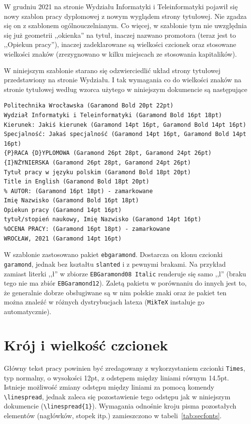 W grudniu 2021 na stronie Wydziału Informatyki i Teleinformatyki pojawił się nowy szablon pracy dyplomowej z nowym wyglądem strony tytułowej. Nie zgadza się on z szablonem ogólnouczelnianym. Co więcej, w szablonie tym nie uwzględnia się już geometrii ,,okienka'' na tytuł, inaczej nazwano promotora (teraz jest to ,,Opiekun pracy''), inaczej zadeklarowane są wielkości czcionek oraz stosowane wielkości znaków (zrezygnowano w kilku miejscach ze stosowania kapitalików).

W niniejszym szablonie starano się odzwierciedlić układ strony tytułowej przedstawiony na stronie Wydziału. I tak wymagania co do wielkości znaków na stronie tytułowej według wzorca użytego w niniejszym dokumencie są następujące
\begin{lstlisting}[basicstyle=\footnotesize\ttfamily]
Politechnika Wrocławska (Garamond Bold 20pt 22pt)
Wydział Informatyki i Teleinformatyki (Garamond Bold 16pt 18pt)
Kierunek: Jakiś kierunek (Garamond 14pt 16pt, Garamond Bold 14pt 16pt)
Specjalność: Jakaś specjalność (Garamond 14pt 16pt, Garamond Bold 14pt 16pt)
{P}RACA {D}YPLOMOWA (Garamond 26pt 28pt, Garamond 24pt 26pt)
{I}NŻYNIERSKA (Garamond 26pt 28pt, Garamond 24pt 26pt)
Tytuł pracy w języku polskim (Garamond Bold 18pt 20pt)
Title in English (Garamond Bold 18pt 20pt)
% AUTOR: (Garamond 16pt 18pt) - zamarkowane
Imię Nazwisko (Garamond Bold 16pt 18pt)
Opiekun pracy (Garamond 14pt 16pt)
tytuł/stopień naukowy, Imię Nazwisko (Garamond 14pt 16pt)
%OCENA PRACY: (Garamond 16pt 18pt) - zamarkowane
WROCŁAW, 2021 (Garamond 14pt 16pt)
\end{lstlisting}

W szablonie zastosowano pakiet \texttt{ebgaramond}. Dostarcza on klonu czcionki \texttt{garamond}, jednak bez kształtu \texttt{slanted} i z pewnymi brakami. Na przykład zamiast literki ,,ł'' w zbiorze \texttt{EBGaramond08 Italic} renderuje się samo ,,l'' (braku tego nie ma zbiór \texttt{EBGaramond12}).  Zaletą pakietu  w porównaniu do innych jest to, że generalnie dobrze obsługiwane są w nim polskie znaki oraz że pakiet ten można znaleźć w różnych dystrybucjach latexa (\texttt{MikTeX} instaluje go automatycznie).

\section{Krój i wielkość czcionek}
Główny tekst pracy powinien być zredagowany z wykorzystaniem czcionki \texttt{Times}, typ normalny, o wysokości 12pt, z odstępem między liniami równym 14.5pt. Istnieje możliwość zmiany odstępu między liniami za pomocą komendy \verb?\linespread?, jednak zaleca się pozostawienie tego odstępu jak w niniejszym dokumencie (\verb?\linespread{1}?). Wymagania odnośnie kroju pisma pozostałych elementów (nagłówków, stopek itp.) zamieszczono w tabeli~\ref{tab:secfonts}.


